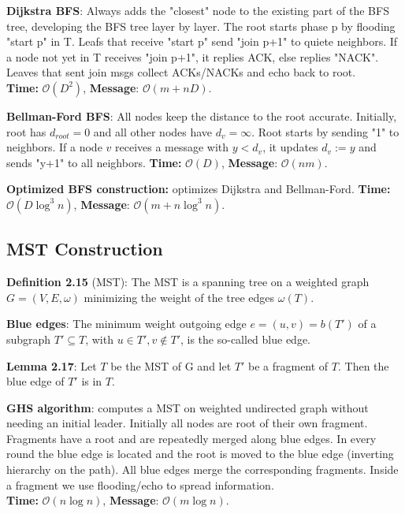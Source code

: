 \documentclass[a4paper, 8pt, landscape]{scrartcl}
\begin{document}
\begin{multicols*}{3}
\textbf{Dijkstra BFS}: Always adds the "closest" node to the existing part of the BFS tree, developing the BFS tree layer by layer. The root starts phase p by flooding "start p" in T. Leafs that receive "start p" send "join p+1" to quiete neighbors. If a node not yet in T receives "join p+1", it replies ACK, else replies "NACK". Leaves that sent join msgs collect ACKs/NACKs and echo back to root.\\
\textbf{Time:} $\mathcal{O}(D^2)$, \textbf{Message}: $\mathcal{O}(m+nD)$.

\textbf{Bellman-Ford BFS}: All nodes keep the distance to the root accurate. Initially, root has $d_{root} = 0$ and all other nodes have $d_v = \infty$. Root starts by sending "1" to neighbors. If a node $v$ receives a message with $y < d_v$, it updates $d_v := y$ and sends "y+1" to all neighbors. \textbf{Time:} $\mathcal{O}(D)$, \textbf{Message}: $\mathcal{O}(nm)$.

\textbf{Optimized BFS construction:} optimizes Dijkstra and Bellman-Ford. \textbf{Time:} $\mathcal{O}(D\log^3 n)$, \textbf{Message}: $\mathcal{O}(m + n\log^3 n)$.

\subsection{MST Construction}

\textbf{Definition 2.15} (MST): The MST is a spanning tree on a weighted graph $G = (V,E,\omega)$ minimizing the weight of the tree edges $\omega(T)$.

\textbf{Blue edges}: The minimum weight outgoing edge $e = (u,v) = b(T')$ of a subgraph $T' \subseteq T$, with $u \in T', v \notin T'$, is the so-called blue edge.

\textbf{Lemma 2.17}: Let $T$ be the MST of G and let $T'$ be a fragment of $T$. Then the blue edge of $T'$ is in $T$.

\textbf{GHS algorithm}: computes a MST on weighted undirected graph without needing an initial leader.  Initially all nodes are root of their own fragment. Fragments have a root and are repeatedly merged along blue edges. In every round the blue edge is located and the root is moved to the blue edge (inverting hierarchy on the path). All blue edges merge the corresponding fragments. Inside a fragment we use flooding/echo to spread information.\\ \textbf{Time:} $\mathcal{O}(n\log n)$, \textbf{Message}: $\mathcal{O}(m\log n)$.

\newpage


\end{multicols*}
\end{document}
